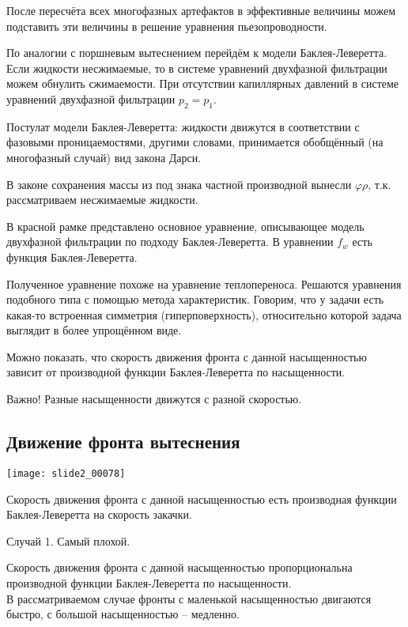 \documentclass[main.tex]{subfiles}
\begin{document}
После пересчёта всех многофазных артефактов в эффективные величины можем подставить эти величины в решение уравнения пьезопроводности.



По аналогии с поршневым вытеснением перейдём к модели Баклея-Леверетта. Если жидкости несжимаемые, то в системе уравнений двухфазной фильтрации можем обнулить сжимаемости. При отсутствии капиллярных давлений в системе уравнений двухфазной фильтрации $p_2=p_1$.

Постулат модели Баклея-Леверетта: жидкости движутся в соответствии с фазовыми проницаемостями, другими словами, принимается обобщённый (на многофазный случай) вид закона Дарси.

В законе сохранения массы из под знака частной производной вынесли $\varphi\rho$, т.к. рассматриваем несжимаемые жидкости.

В красной рамке представлено основное уравнение, описывающее модель двухфазной фильтрации по подходу Баклея-Леверетта. В уравнении $f_w$ есть функция Баклея-Леверетта.

Полученное уравнение похоже на уравнение теплопереноса. Решаются уравнения подобного типа с помощью метода характеристик. Говорим, что у задачи есть какая-то встроенная симметрия (гиперповерхность), относительно которой задача выглядит в более упрощённом виде. 


Можно показать, что скорость движения фронта с данной насыщенностью зависит от производной функции Баклея-Леверетта по насыщенности.

Важно! Разные насыщенности движутся с разной скоростью.

\subsection{Движение фронта вытеснения}

\texttt{[image: slide2\_00078]}

Скорость движения фронта с данной насыщенностью есть производная функции Баклея-Леверетта на скорость закачки.

Случай 1. Самый плохой.


Скорость движения фронта с данной насыщенностью пропорциональна производной функции Баклея-Леверетта по насыщенности.\\

В рассматриваемом случае фронты с маленькой насыщенностью двигаются быстро, с большой насыщенностью -- медленно.
\end{document}
